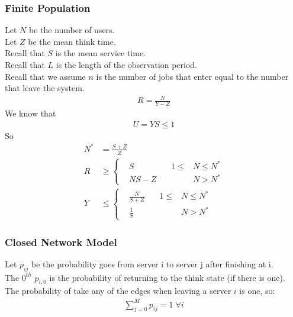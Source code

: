 \subsubsection{Finite Population}

Let $N$ be the number of users. \\
Let $Z$ be the mean think time. \\
Recall that $S$ is the mean service time. \\
Recall that $L$ is the length of the observation period. \\
Recall that we assume $n$ is the number of jobs that enter equal to the number
that leave the system.
\begin{equation*} \begin{split}
	R = \frac{N}{Y-Z}
\end{split} \end{equation*}
We know that
\begin{equation*} \begin{split}
	U = YS \le 1
\end{split} \end{equation*}
So
\begin{align*}
	N^*  & = \frac{S+Z}{Z} \\
	R & \ge 
	\left\{
		\begin{alignedat}{3}
			& S     & \, & 1 \le  & N \le N^* \\
			& NS-Z  & \, &        & N  >  N^*
		\end{alignedat}
	\right. \\
	Y & \le
	\left\{
		\begin{alignedat}{3}
			& \frac{N}{S+Z} & \, & 1 \le  & N \le N^* \\
			& \frac{1}{S}   & \, &        & N  >  N^*
		\end{alignedat}
	\right.
\end{align*}

\subsubsection{Closed Network Model}
Let $p_{ij}$ be the probability goes from server i to server j after finishing at i. \\
The $0^{th}$ $p_{i,0}$ is the probability of returning to the think state (if there is one). \\
The probability of take any of the edges when leaving a server $i$ is one, so:
\begin{equation*} \begin{split}
	\sum_{j=0}^{M} p_{ij} = 1 \; \forall i
\end{split} \end{equation*}

